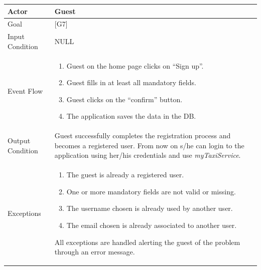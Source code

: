 \documentclass[a4paper,11pt]{report} %
\newcommand{\mts}{\mbox{\normalfont\itshape myTaxiService}}
\begin{document}
	\begin{center}
		\begin{tabular}{| l | p{9cm} |}\hline
			Actor & Guest\\\hline
			Goal & {[}G7{]} \\\hline
			Input Condition & NULL\\\hline
			Event Flow & \begin{enumerate}
							\item Guest on the home page clicks on ``Sign up''.
							\item Guest fills in at least all mandatory fields.
							\item Guest clicks on the ``confirm'' button.
							\item The application saves the data in the DB.
						 \end{enumerate}\\\hline
			Output Condition & Guest successfully completes the registration process and
								becomes a registered user. From now on s/he can login to
								the application using her/his credentials and use \mts{}.\\\hline
			Exceptions & {\begin{enumerate}
							\item The guest is already a registered user.
							\item One or more mandatory fields are not valid or missing.
							\item The username chosen is already used by another user.
							\item The email chosen is already associated to another user.
						  \end{enumerate} All exceptions are handled alerting the guest of the
						problem through an error message.}\\\hline
		\end{tabular}
	\end{center}


%	
	\pagebreak
	\afterpage{}

	
\end{document}
